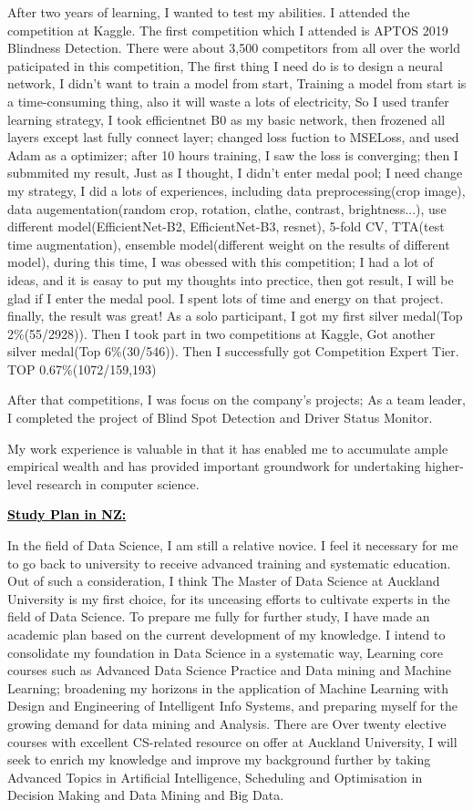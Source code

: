 \documentclass{article}
\newcommand{\statement}[1]{\par\medskip
  \underline{\textcolor{black}{\textbf{#1:}}}\space
}
\begin{document}
After two years of learning, I wanted to test my abilities. I attended the competition at Kaggle. The first competition which I attended is APTOS 2019 Blindness Detection. There were about 3,500 competitors from all over the world paticipated in this competition, The first thing I need do is to design a neural network, I didn't want to train a model from start, Training a model from start is a time-consuming thing, also it will waste a lots of electricity, So I used tranfer learning strategy, I took efficientnet B0 as my basic network, then frozened all layers except last fully connect layer; changed loss fuction to MSELoss, and used Adam as a optimizer; after 10 hours training, I saw the loss is converging; then I submmited my result, Just as I thought, I didn't enter medal pool; I need change my strategy, I did a lots of experiences, including data preprocessing(crop image), data augementation(random crop, rotation, clathe, contrast, brightness...), use different model(EfficientNet-B2, EfficientNet-B3, resnet),  5-fold CV, TTA(test time augmentation), ensemble model(different weight on the results of different model), during this time, I was obessed with this competition; I had a lot of ideas, and it is easay to put my thoughts into prectice, then got result, I will be glad if I enter the medal pool. I spent lots of time and energy on that project. finally, the result was great! As a solo participant, I got my first silver medal(Top 2\%(55/2928)). Then I took part in two competitions at Kaggle, Got another silver medal(Top 6\%(30/546)). Then I successfully got Competition Expert Tier. TOP 0.67\%(1072/159,193)

After that competitions, I was focus on the company's projects; As a team leader, I completed the project of Blind Spot Detection and Driver Status Monitor.

My work experience is valuable in that it has enabled me to accumulate ample empirical wealth and has provided important groundwork for undertaking higher-level research in computer science.

\statement{Study Plan in NZ}

In the field of Data Science, I am still a relative novice.  I feel it necessary for me to go back to university to receive advanced training and systematic education. Out of such a consideration, I think The Master of Data Science at Auckland University is my first choice, for its unceasing efforts to cultivate experts in the field of Data Science. To prepare me fully for further study, I have made an academic plan based on the current development of my knowledge. I intend to consolidate my foundation in Data Science in a systematic way, Learning core courses such as Advanced Data Science Practice and Data mining and Machine Learning; broadening my horizons in the application of Machine Learning with Design and Engineering of Intelligent Info Systems,  and preparing myself for the growing demand for data mining and Analysis. There are Over twenty elective courses with excellent CS-related resource on offer at Auckland University, I will seek to enrich my knowledge and improve my background further by taking Advanced Topics in Artificial Intelligence, Scheduling and Optimisation in Decision Making and Data Mining and Big Data.
\end{document}
